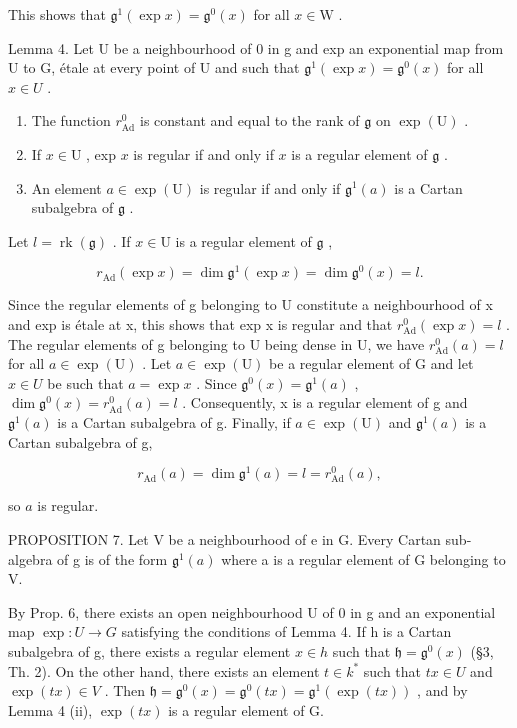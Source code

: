 This shows that \(\mathfrak{g}^1 (\exp x) = \mathfrak{g}^0 (x)\) for all \(x\in \mathrm{W}\) .

Lemma 4. Let U be a neighbourhood of 0 in g and exp an exponential map from U to G, étale at every point of U and such that \(\mathfrak{g}^{1}(\exp x) = \mathfrak{g}^{0}(x)\) for all \(x \in U\) .

\begin{enumerate}
\def\labelenumi{(\roman{enumi})}
\item
  The function \(r_{\mathrm{Ad}}^0\) is constant and equal to the rank of \(\mathfrak{g}\) on \(\exp(\mathrm{U})\) .
\item
  If \(x \in \mathrm{U}\) , exp \(x\) is regular if and only if \(x\) is a regular element of \(\mathfrak{g}\) .
\item
  An element \(a \in \exp(\mathrm{U})\) is regular if and only if \(\mathfrak{g}^1(a)\) is a Cartan subalgebra of \(\mathfrak{g}\) .
\end{enumerate}

Let \(l = \operatorname{rk}(\mathfrak{g})\) . If \(x \in \mathrm{U}\) is a regular element of \(\mathfrak{g}\) ,

\[
r _ {\mathrm{Ad}} (\exp x) = \dim \mathfrak {g} ^ {1} (\exp x) = \dim \mathfrak {g} ^ {0} (x) = l.
\]

Since the regular elements of g belonging to U constitute a neighbourhood of x and exp is étale at x, this shows that exp x is regular and that \(r_{\mathrm{Ad}}^{0}(\exp x) = l\) . The regular elements of g belonging to U being dense in U, we have \(r_{\mathrm{Ad}}^{0}(a) = l\) for all \(a \in \exp(\mathrm{U})\) . Let \(a \in \exp(\mathrm{U})\) be a regular element of G and let \(x \in U\) be such that \(a = \exp x\) . Since \(\mathfrak{g}^{0}(x) = \mathfrak{g}^{1}(a)\) , \(\dim \mathfrak{g}^{0}(x) = r_{\mathrm{Ad}}^{0}(a) = l\) . Consequently, x is a regular element of g and \(\mathfrak{g}^{1}(a)\) is a Cartan subalgebra of g. Finally, if \(a \in \exp(\mathrm{U})\) and \(\mathfrak{g}^{1}(a)\) is a Cartan subalgebra of g,

\[
r _ {\mathrm{Ad}} (a) = \dim \mathfrak {g} ^ {1} (a) = l = r _ {\mathrm{Ad}} ^ {0} (a),
\]

so \(a\) is regular.

PROPOSITION 7. Let V be a neighbourhood of e in G. Every Cartan sub-algebra of g is of the form \(\mathfrak{g}^{1}(a)\) where a is a regular element of G belonging to V.

By Prop. 6, there exists an open neighbourhood U of 0 in g and an exponential map \(\exp: U \to G\) satisfying the conditions of Lemma 4. If h is a Cartan subalgebra of g, there exists a regular element \(x \in h\) such that \(\mathfrak{h} = \mathfrak{g}^{0}(x)\) (§3, Th. 2). On the other hand, there exists an element \(t \in k^{*}\) such that \(tx \in U\) and \(\exp(tx) \in V\) . Then \(\mathfrak{h} = \mathfrak{g}^{0}(x) = \mathfrak{g}^{0}(tx) = \mathfrak{g}^{1}(\exp(tx))\) , and by Lemma 4 (ii), \(\exp(tx)\) is a regular element of G.


